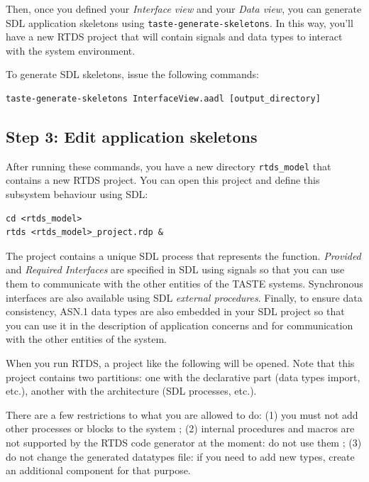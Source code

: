 \documentclass[11pt]{book}
\begin{document}
   Then, once you defined your \textit{Interface view} and your \textit{Data
   view}, you can generate SDL application skeletons using
   \texttt{taste-generate-skeletons}. In this way, you'll have a new RTDS project that will
   contain signals and data types to interact with the system environment.

   To generate SDL skeletons, issue the following commands:

   \begin{verbatim}
taste-generate-skeletons InterfaceView.aadl [output_directory]
   \end{verbatim}

   \subsection{Step 3: Edit application skeletons}

   After running these commands, you have a new directory \texttt{rtds\_model}
   that contains a new RTDS project. You can open this project and define this
   subsystem behaviour using SDL:

   \begin{verbatim}
cd <rtds_model>
rtds <rtds_model>_project.rdp &
   \end{verbatim}

   The project contains a unique SDL process that represents the function. 
   \textit{Provided} and \textit{Required Interfaces} are
   specified in SDL using signals so that you can use them to communicate with
   the other entities of the TASTE systems. Synchronous interfaces are also
   available using SDL \textit{external procedures}. Finally, to ensure data consistency,
   ASN.1 data types are also embedded in your SDL project so that you can use it
   in the description of application concerns and for communication with the
   other entities of the system.

   When you run RTDS, a project like the following will be opened. Note that this project
   contains two partitions: one with the declarative part (data types import,
   etc.), another with the architecture (SDL processes, etc.).

   \centerline{}

   There are a few restrictions to what you are allowed to do: (1) you must not add
   other processes or blocks to the system ; (2) internal procedures and macros are not
   supported by the RTDS code generator at the moment: do not use them ; (3) do not change
   the generated datatypes file: if you need to add new types, create an additional component
   for that purpose.
\end{document}
